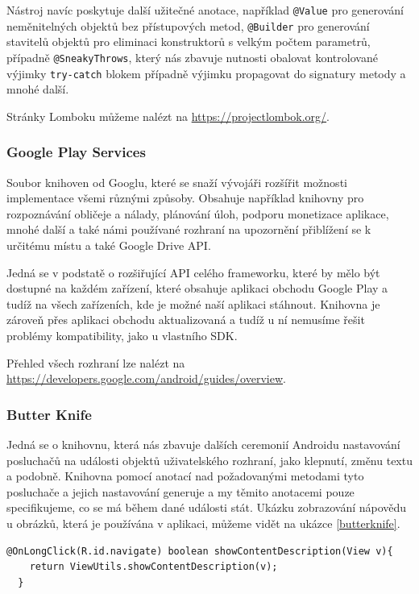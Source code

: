 \documentclass{article}
\begin{document}
Nástroj navíc poskytuje další užitečné anotace, například \texttt{@Value} pro generování neměnitelných objektů
bez přístupových metod, \texttt{@Builder} pro generování stavitelů objektů pro eliminaci konstruktorů s velkým
počtem parametrů, případně \texttt{@SneakyThrows}, který nás zbavuje nutnosti obalovat kontrolované výjimky
\texttt{try-catch} blokem případně výjimku propagovat do signatury metody a mnohé další.

Stránky Lomboku můžeme nalézt na \url{https://projectlombok.org/}.

\subsubsection{Google Play Services}
Soubor knihoven od Googlu, které se snaží vývojáři rozšířit možnosti implementace všemi různými způsoby.
Obsahuje například knihovny pro rozpoznávání obličeje a nálady, plánování úloh, podporu monetizace aplikace,
mnohé další a také námi používané rozhraní na upozornění přiblížení se k určitému místu a také Google Drive API.

Jedná se v podstatě o rozšiřující API celého frameworku, které by mělo být dostupné na každém zařízení, které
obsahuje aplikaci obchodu Google Play a tudíž na všech zařízeních, kde je možné naší aplikaci stáhnout.
Knihovna je zároveň přes aplikaci obchodu aktualizovaná a tudíž u ní nemusíme řešit problémy
kompatibility, jako u vlastního SDK. \cite{gms}

Přehled všech rozhraní lze nalézt na \url{https://developers.google.com/android/guides/overview}.

\subsubsection{Butter Knife}
Jedná se o knihovnu, která nás zbavuje dalších ceremonií Androidu nastavování posluchačů
na události objektů uživatelského rozhraní, jako klepnutí, změnu textu a podobně. Knihovna pomocí
anotací nad požadovanými metodami tyto posluchače a jejich nastavování generuje a my těmito anotacemi
pouze specifikujeme, co se má během dané události stát. Ukázku zobrazování nápovědu u obrázků, která je
používána v aplikaci, můžeme vidět na ukázce \ref{butterknife}.

\begin{lstlisting}[label=butterknife,caption=Použití knihovny Butter Knife]
  @OnLongClick(R.id.navigate) boolean showContentDescription(View v){
    return ViewUtils.showContentDescription(v);
  }

\end{lstlisting}
\end{document}

